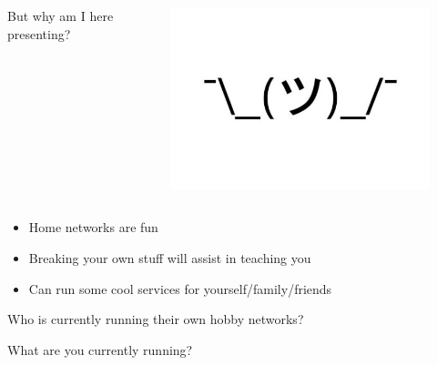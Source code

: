 \documentclass{beamer}
\begin{document}
\begin{frame}
    \begin{columns}
        \begin{column}{0.5\textwidth}
            But why am I here presenting?
        \end{column}
        \begin{column}{0.5\textwidth}
            \begin{figure}
                \centering
                \includegraphics[width=\textwidth,keepaspectratio]{../resources/shrug.jpg}
            \end{figure}
        \end{column}
    \end{columns}
\end{frame}

\begin{frame}
    \begin{itemize}
        \item Home networks are fun
        \item Breaking your own stuff will assist in teaching you
        \item Can run some cool services for yourself/family/friends
    \end{itemize}
\end{frame}

\begin{frame}
    \begin{center}
        Who is currently running their own hobby networks?
        \vspace{5mm}\par\noindent
        What are you currently running?
    \end{center}
\end{frame}
\end{document}
